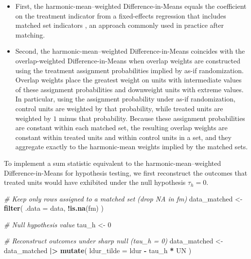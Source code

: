 \documentclass[
  12pt,
  leqno]{article}
\newenvironment{Shaded}{\begin{snugshade}}{\end{snugshade}}
\newcommand{\AttributeTok}[1]{\textcolor[rgb]{0.13,0.29,0.53}{#1}}
\newcommand{\CommentTok}[1]{\textcolor[rgb]{0.56,0.35,0.01}{\textit{#1}}}
\newcommand{\DecValTok}[1]{\textcolor[rgb]{0.00,0.00,0.81}{#1}}
\newcommand{\FunctionTok}[1]{\textcolor[rgb]{0.13,0.29,0.53}{\textbf{#1}}}
\newcommand{\NormalTok}[1]{#1}
\newcommand{\OtherTok}[1]{\textcolor[rgb]{0.56,0.35,0.01}{#1}}
\newcommand{\SpecialCharTok}[1]{\textcolor[rgb]{0.81,0.36,0.00}{\textbf{#1}}}
\begin{document}
\begin{itemize}
\item
  First, the harmonic-mean--weighted Difference-in-Means equals the
  coefficient on the treatment indicator from a fixed-effects regression
  that includes matched set indicators
  \citep[pp.~228-229]{hansenbowers2008}, an approach commonly used in
  practice after matching.
\item
  Second, the harmonic-mean--weighted Difference-in-Means coincides with
  the overlap-weighted Difference-in-Means \citep{lietal2018} when
  overlap weights are constructed using the treatment assignment
  probabilities implied by as-if randomization. Overlap weights place
  the greatest weight on units with intermediate values of these
  assignment probabilities and downweight units with extreme values. In
  particular, using the assignment probability under as-if
  randomization, control units are weighted by that probability, while
  treated units are weighted by \(1\) minus that probability. Because
  these assignment probabilities are constant within each matched set,
  the resulting overlap weights are constant within treated units and
  within control units in a set, and they aggregate exactly to the
  harmonic-mean weights implied by the matched sets.
\end{itemize}

To implement a sum statistic equivalent to the harmonic-mean--weighted
Difference-in-Means for hypothesis testing, we first reconstruct the
outcomes that treated units would have exhibited under the null
hypothesis \(\tau_h = 0\).

\singlespacing

\begin{Shaded}
\begin{Highlighting}[]
\CommentTok{\# Keep only rows assigned to a matched set (drop NA in fm)}
\NormalTok{data\_matched }\OtherTok{\textless{}{-}} \FunctionTok{filter}\NormalTok{(}
  \AttributeTok{.data =}\NormalTok{ data, }\SpecialCharTok{!}\FunctionTok{is.na}\NormalTok{(fm)}
\NormalTok{)}

\CommentTok{\# Null hypothesis value}
\NormalTok{tau\_h }\OtherTok{\textless{}{-}} \DecValTok{0}

\CommentTok{\# Reconstruct outcomes under sharp null (tau\_h = 0)}
\NormalTok{data\_matched }\OtherTok{\textless{}{-}}\NormalTok{ data\_matched }\SpecialCharTok{|\textgreater{}}
  \FunctionTok{mutate}\NormalTok{(}
    \AttributeTok{ldur\_tilde =}\NormalTok{ ldur }\SpecialCharTok{{-}}\NormalTok{ tau\_h }\SpecialCharTok{*}\NormalTok{ UN}
\NormalTok{  )}
\end{Highlighting}
\end{Shaded}
\end{document}
